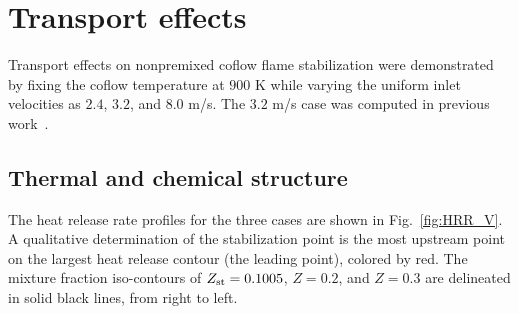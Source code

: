 \documentclass[review,3p,times]{elsarticle}
\begin{document}

\section{Transport effects}

Transport effects on nonpremixed coflow flame stabilization were demonstrated by fixing the coflow temperature at $900$ K while varying the uniform inlet velocities as $2.4$, $3.2$, and $8.0$ m/s.  The $3.2$ m/s case was computed in previous work~\cite{deng15}.  

\begin{table}
  \caption{Computational domain and number of grid points.}
  \label{table:domain_V}
  \centering
  \normalsize
\end{table}

\subsection{Thermal and chemical structure}  
The heat release rate profiles for the three cases are shown in Fig.~\ref{fig:HRR_V}.  A qualitative determination of the stabilization point is the most upstream point on the largest heat release contour (the leading point), colored by red.  The mixture fraction iso-contours of $Z_{\rm st} = 0.1005$, $Z = 0.2$, and $Z = 0.3$ are delineated in solid black lines, from right to left.
\end{document}
